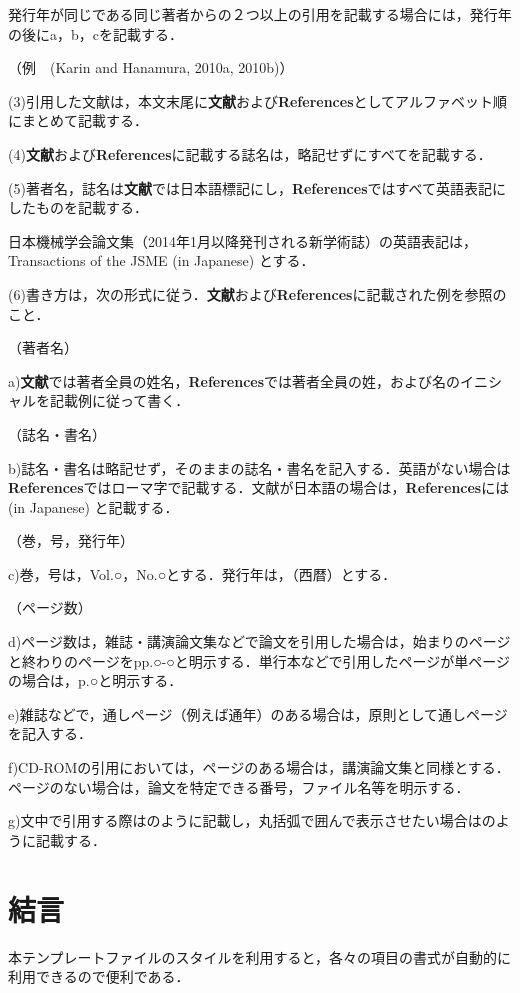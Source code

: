 \documentclass[a4jsme, fleqn]{jsmepaper}
\begin{document}
発行年が同じである同じ著者からの２つ以上の引用を記載する場合には，発行年の後にa，b，cを記載する．

（例　(Karin and Hanamura, 2010a, 2010b)）

(3)引用した文献は，本文末尾に\textbf{文献}および\textbf{References}としてアルファベット順にまとめて記載する．

(4)\textbf{文献}および\textbf{References}に記載する誌名は，略記せずにすべてを記載する．

(5)著者名，誌名は\textbf{文献}では日本語標記にし，\textbf{References}ではすべて英語表記にしたものを記載する．

日本機械学会論文集（2014年1月以降発刊される新学術誌）の英語表記は，Transactions of the JSME (in Japanese) とする．

(6)書き方は，次の形式に従う．\textbf{文献}および\textbf{References}に記載された例を参照のこと．

（著者名）

a)\textbf{文献}では著者全員の姓名，\textbf{References}では著者全員の姓，および名のイニシャルを記載例に従って書く．

（誌名・書名）

b)誌名・書名は略記せず，そのままの誌名・書名を記入する．英語がない場合は\textbf{References}ではローマ字で記載する．文献が日本語の場合は，\textbf{References}には(in Japanese) と記載する．

（巻，号，発行年）

c)巻，号は，Vol.○，No.○とする．発行年は，（西暦）とする．

（ページ数）

d)ページ数は，雑誌・講演論文集などで論文を引用した場合は，始まりのページと終わりのページをpp.○-○と明示する．単行本などで引用したページが単ページの場合は，p.○と明示する．

e)雑誌などで，通しページ（例えば通年）のある場合は，原則として通しページを記入する．

f)CD-ROMの引用においては，ページのある場合は，講演論文集と同様とする．ページのない場合は，論文を特定できる番号，ファイル名等を明示する．

g)文中で引用する際は\cite{Ahrendt1951}のように記載し，丸括弧で囲んで表示させたい場合は\parencite{Ahrendt1951}のように記載する．

\section{結言}

本テンプレートファイルのスタイルを利用すると，各々の項目の書式が自動的に利用できるので便利である．
\end{document}

